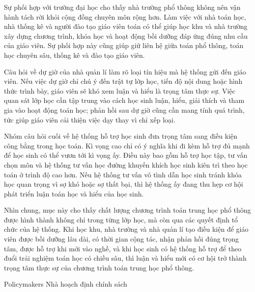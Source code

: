 {{    Sự phối hợp với trường đại học cho thấy nhà trường phổ thông không nên vận hành tách rời khỏi cộng đồng chuyên môn rộng hơn. Làm việc với nhà toán học, nhà thống kê và người đào tạo giáo viên toán có thể giúp học khu và nhà trường xây dựng chương trình, khóa học và hoạt động bồi dưỡng đáp ứng đúng nhu cầu của giáo viên. Sự phối hợp này cũng giúp giữ liên hệ giữa toán phổ thông, toán học chuyên sâu, thống kê và đào tạo giáo viên.

    Câu hỏi về dự giờ của nhà quản lí làm rõ loại tín hiệu mà hệ thống gửi đến giáo viên. Nếu việc dự giờ chỉ chú ý đến trật tự lớp học, tiến độ nội dung hoặc hình thức trình bày, giáo viên sẽ khó xem luận và hiểu là trọng tâm thực sự. Việc quan sát lớp học cần tập trung vào cách học sinh luận, hiểu, giải thích và tham gia vào hoạt động toán học; phản hồi sau dự giờ cũng cần mang tính quá trình, tức giúp giáo viên cải thiện việc dạy thay vì chỉ xếp loại.

    Nhóm câu hỏi cuối về hệ thống hỗ trợ học sinh đưa trọng tâm sang điều kiện công bằng trong học toán. Kì vọng cao chỉ có ý nghĩa khi đi kèm hỗ trợ đủ mạnh để học sinh có thể vươn tới kì vọng ấy. Điều này bao gồm hỗ trợ học tập, tư vấn chọn môn và hệ thống tư vấn học đường khuyến khích học sinh kiên trì theo học toán ở trình độ cao hơn. Nếu hệ thống tư vấn vô tình dẫn học sinh tránh khóa học quan trọng vì sợ khó hoặc sợ thất bại, thì hệ thống ấy đang thu hẹp cơ hội phát triển luận toán học và hiểu của học sinh.

    Nhìn chung, mục này cho thấy chất lượng chương trình toán trung học phổ thông được hình thành không chỉ trong từng lớp học, mà còn qua các quyết định tổ chức của hệ thống. Khi học khu, nhà trường và nhà quản lí tạo điều kiện để giáo viên được bồi dưỡng lâu dài, có thời gian cộng tác, nhận phản hồi đúng trọng tâm, được hỗ trợ khi mới vào nghề, và khi học sinh có hệ thống hỗ trợ để theo đuổi trải nghiệm toán học có chiều sâu, thì luận và hiểu mới có cơ hội trở thành trọng tâm thực sự của chương trình toán trung học phổ thông.}
  }

\ParallelSection
  {Policymakers}
  {Nhà hoạch định chính sách}
  {}

